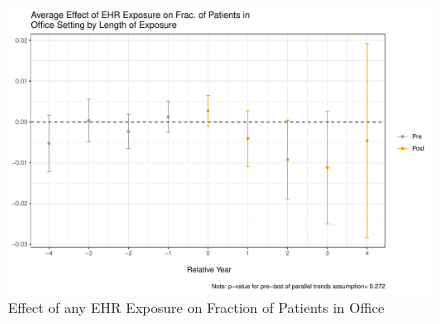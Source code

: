 \documentclass[11pt]{article}
\begin{document}
\begin{figure}[ht]
\caption{Effect of any EHR Exposure on Fraction of Patients in Office}
\vspace{2mm}
\centering
\hspace{20mm}
\includegraphics[scale=.45]{Objects/CS_office_frac_allEHR.pdf}
\vspace{3mm}
\newline
        \hspace{0.1cm}
\end{figure}
\end{document}

